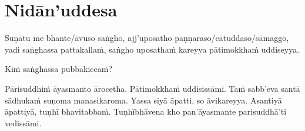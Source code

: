 
\section{Nidān'uddesa}
\label{nidan'uddesa}

\ifninebythirteenversion\vspace{0.2em}\fi
\ifafiveversion\vspace{0.2em}\fi

Suṇātu me bhante/āvuso saṅgho, ajj'uposatho paṇṇaraso/cātuddaso/sāmaggo,\makeatletter\hyperlink{endnote15-appendix}\makeatother{} yadi saṅghassa pattakallaṁ, saṅgho uposathaṁ kareyya pātimokkhaṁ\makeatletter\hyperlink{endnote14-appendix}\makeatother{} uddiseyya.

Kiṁ saṅghassa pubbakiccaṁ?

Pārisuddhiṁ āyasmanto ārocetha. Pātimokkhaṁ uddisissāmi. Taṁ sabb'eva santā sādhukaṁ suṇoma manasikaroma. Yassa siyā āpatti, so āvikareyya\makeatletter\hyperlink{endnote16-appendix}\makeatother. Asantiyā āpattiyā, tuṇhī bhavitabbaṁ. Tuṇhībhāvena kho pan'āyasmante parisuddhā'ti vedissāmi.

